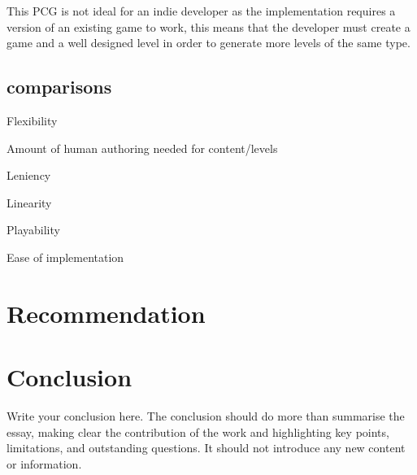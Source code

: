 \documentclass{scrartcl}
\begin{document}
This PCG is not ideal for an indie developer as the implementation requires a version of an existing game to work, this means that the developer must create a game and a well designed level in order to generate more levels of the same type.







\subsection{comparisons}

Flexibility

Amount of human authoring needed for content/levels

Leniency

Linearity

Playability

Ease of implementation






\section{Recommendation}


\section{Conclusion}

Write your conclusion here. The conclusion should do more than summarise the essay, making clear the contribution of the work and highlighting key points, limitations, and outstanding questions. It should not introduce any new content or information.



\end{document}
